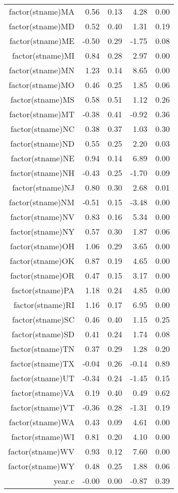 \begin{table}[ht]
\begin{tabular}{rrrrr}
  factor(stname)MA & 0.56 & 0.13 & 4.28 & 0.00 \\ 
  factor(stname)MD & 0.52 & 0.40 & 1.31 & 0.19 \\ 
  factor(stname)ME & -0.50 & 0.29 & -1.75 & 0.08 \\ 
  factor(stname)MI & 0.84 & 0.28 & 2.97 & 0.00 \\ 
  factor(stname)MN & 1.23 & 0.14 & 8.65 & 0.00 \\ 
  factor(stname)MO & 0.46 & 0.25 & 1.85 & 0.06 \\ 
  factor(stname)MS & 0.58 & 0.51 & 1.12 & 0.26 \\ 
  factor(stname)MT & -0.38 & 0.41 & -0.92 & 0.36 \\ 
  factor(stname)NC & 0.38 & 0.37 & 1.03 & 0.30 \\ 
  factor(stname)ND & 0.55 & 0.25 & 2.20 & 0.03 \\ 
  factor(stname)NE & 0.94 & 0.14 & 6.89 & 0.00 \\ 
  factor(stname)NH & -0.43 & 0.25 & -1.70 & 0.09 \\ 
  factor(stname)NJ & 0.80 & 0.30 & 2.68 & 0.01 \\ 
  factor(stname)NM & -0.51 & 0.15 & -3.48 & 0.00 \\ 
  factor(stname)NV & 0.83 & 0.16 & 5.34 & 0.00 \\ 
  factor(stname)NY & 0.57 & 0.30 & 1.87 & 0.06 \\ 
  factor(stname)OH & 1.06 & 0.29 & 3.65 & 0.00 \\ 
  factor(stname)OK & 0.87 & 0.19 & 4.65 & 0.00 \\ 
  factor(stname)OR & 0.47 & 0.15 & 3.17 & 0.00 \\ 
  factor(stname)PA & 1.18 & 0.24 & 4.85 & 0.00 \\ 
  factor(stname)RI & 1.16 & 0.17 & 6.95 & 0.00 \\ 
  factor(stname)SC & 0.46 & 0.40 & 1.15 & 0.25 \\ 
  factor(stname)SD & 0.41 & 0.24 & 1.74 & 0.08 \\ 
  factor(stname)TN & 0.37 & 0.29 & 1.28 & 0.20 \\ 
  factor(stname)TX & -0.04 & 0.26 & -0.14 & 0.89 \\ 
  factor(stname)UT & -0.34 & 0.24 & -1.45 & 0.15 \\ 
  factor(stname)VA & 0.19 & 0.40 & 0.49 & 0.62 \\ 
  factor(stname)VT & -0.36 & 0.28 & -1.31 & 0.19 \\ 
  factor(stname)WA & 0.43 & 0.09 & 4.61 & 0.00 \\ 
  factor(stname)WI & 0.81 & 0.20 & 4.10 & 0.00 \\ 
  factor(stname)WV & 0.93 & 0.12 & 7.60 & 0.00 \\ 
  factor(stname)WY & 0.48 & 0.25 & 1.88 & 0.06 \\ 
  year.c & -0.00 & 0.00 & -0.87 & 0.39 \\ 
   \hline
\end{tabular}
\end{table}
